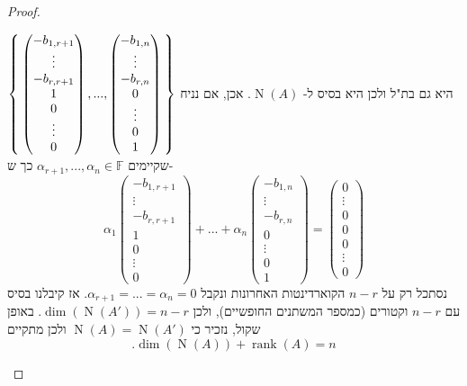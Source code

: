 \documentclass[12pt]{report}
\theoremstyle{plain}
\theoremstyle{definition}
\newcommand{\F}{\mathbb{F}}
\DeclareMathOperator{\rank}{rank}
\newcommand{\0}{\mathbf{0}}
\DeclareMathOperator{\Null}{N}
\begin{document}
\begin{teacher}
\begin{proof}
\begin{enumerate}[label=\alph*.]
$\Set{\begin{pmatrix}
-b_{1,r+1} \\
\vdots \\
-b_{r,r+1} \\
1 \\
0 \\
\vdots \\
0
\end{pmatrix},...,\begin{pmatrix}
-b_{1,n} \\
\vdots \\
-b_{r,n} \\
0 \\
\vdots \\
0 \\
1
\end{pmatrix}}$
היא גם בת"ל ולכן היא בסיס 
ל-
$\Null(A)$.
אכן, אם נניח שקיימים
$\alpha_{r+1},...,\alpha_n\in\F$
כך ש-
$$
\alpha_1\begin{pmatrix}
-b_{1,r+1} \\
\vdots \\
-b_{r,r+1} \\
1 \\
0 \\
\vdots \\
0
\end{pmatrix}+...+\alpha_n\begin{pmatrix}
-b_{1,n} \\
\vdots \\
-b_{r,n} \\
0 \\
\vdots \\
0 \\
1
\end{pmatrix}=\begin{pmatrix}
0 \\
\vdots \\
0  \\
0 \\
0 \\
\vdots \\
0
\end{pmatrix}
$$
נסתכל רק על
$n-r$
הקוארדינטות האחרונות ונקבל
$\alpha_{r+1}=...=\alpha_n=0$.
אז קיבלנו בסיס עם
$n-r$
וקטורים (כמספר המשתנים החופשיים), ולכן 
$\dim(\Null(A'))=n-r$.
באופן שקול, נזכיר כי
$\Null(A)=\Null(A')$
ולכן מתקיים
$$
.\dim(\Null(A))+\rank(A)=n
$$

\end{enumerate}
\end{proof}
\end{teacher}
\end{document}
